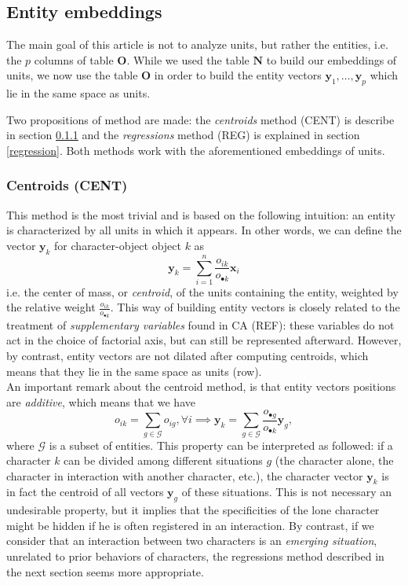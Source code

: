 \documentclass[
twocolumn,
]{ceurart}
\begin{document}
\subsection{Entity embeddings}
\label{entity_embeddings}

The main goal of this article is not to analyze units, but rather the entities, i.e. the $p$ columns of table $\mathbf{O}$. While we used the table $\mathbf{N}$ to build our embeddings of units, we now use the table $\mathbf{O}$ in order to build the entity vectors $\mathbf{y}_1, \ldots, \mathbf{y}_p$ which lie in the same space as units. 

Two propositions of method are made: the \emph{centroids} method (CENT) is describe in section \ref{centroid} and the \emph{regressions} method (REG) is explained in section \ref{regression}. Both methods work with the aforementioned embeddings of units.

\subsubsection{Centroids (CENT)}
\label{centroid}

This method is the most trivial and is based on the following intuition: an entity is characterized by all units in which it appears. In other words, we can define the vector $\mathbf{y}_k$ for character-object object $k$ as
\begin{equation}
\mathbf{y}_k = \sum_{i=1}^n \frac{o_{ik}}{o_{\bullet k}} \mathbf{x}_i
\end{equation}
i.e. the center of mass, or \emph{centroid}, of the units containing the entity, weighted by the relative weight $\frac{o_{ik}}{o_{\bullet k}}$. This way of building entity vectors is closely related to the treatment of \emph{supplementary variables} found in CA (REF): these variables do not act in the choice of factorial axis, but can still be represented afterward. However, by contrast, entity vectors are not dilated after computing centroids, which means that they lie in the same space as units (row). \\
An important remark about the centroid method, is that entity vectors positions are \emph{additive}, which means that we have
\begin{equation}
o_{ik} = \sum_{g \in \mathcal{G}} o_{ig}, \forall i \implies \mathbf{y}_k = \sum_{g \in \mathcal{G}} \frac{o_{\bullet g}}{o_{\bullet k}} \mathbf{y}_g,
\end{equation}
where $\mathcal{G}$ is a subset of entities. This property can be interpreted as followed: if a character $k$ can be divided among different situations $g$ (the character alone, the character in interaction with another character, etc.), the character vector $\mathbf{y}_k$ is in fact the centroid of all vectors $\mathbf{y}_g$ of these situations. This is not necessary an undesirable property, but it implies that the specificities of the lone character might be hidden if he is often registered in an interaction. By contrast, if we consider that an interaction between two characters is an \emph{emerging situation}, unrelated to prior behaviors of characters, the regressions method described in the next section seems more appropriate.
\end{document}
